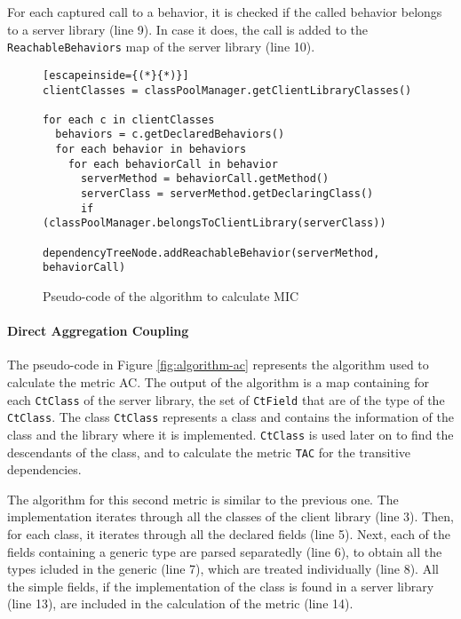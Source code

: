 For each captured call to a behavior, it is checked if the called behavior belongs to a server library (line 9). In case it does, the call is added to the \texttt{ReachableBehaviors} map of the server library (line 10).

\begin{figure}[ht!]
\begin{lstlisting}[escapeinside={(*}{*)}]
clientClasses = classPoolManager.getClientLibraryClasses()

for each c in clientClasses
  behaviors = c.getDeclaredBehaviors()
  for each behavior in behaviors
    for each behaviorCall in behavior
      serverMethod = behaviorCall.getMethod()
      serverClass = serverMethod.getDeclaringClass()
      if (classPoolManager.belongsToClientLibrary(serverClass))
        dependencyTreeNode.addReachableBehavior(serverMethod, behaviorCall)
\end{lstlisting}
\caption{Pseudo-code of the algorithm to calculate MIC}
\label{fig:algorithm-mic}
\end{figure}

\paragraph{Direct Aggregation Coupling}
The pseudo-code in Figure \ref{fig:algorithm-ac} represents the algorithm used to calculate the metric AC. The output of the algorithm is a map containing for each \texttt{CtClass} of the server library, the set of \texttt{CtField} that are of the type of the \texttt{CtClass}. The class \texttt{CtClass} represents a class and contains the information of the class and the library where it is implemented. \texttt{CtClass} is used later on to find the descendants of the class, and to calculate the metric \texttt{TAC} for the transitive dependencies.

The algorithm for this second metric is similar to the previous one. The implementation iterates through all the classes of the client library (line 3). Then, for each class, it iterates through all the declared fields (line 5). Next, each of the fields containing a generic type are parsed separatedly (line 6), to obtain all the types icluded in the generic  (line 7), which are treated individually (line 8). All the simple fields, if the implementation of the class is found in a server library (line 13), are included in the calculation of the metric (line 14).

